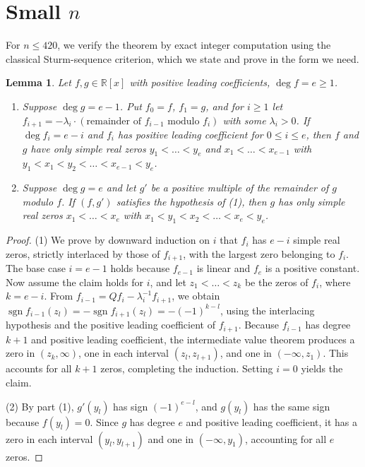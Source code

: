 \documentclass[11pt]{amsart}
\newtheorem{lemma}[theorem]{Lemma}
\theoremstyle{remark}
\newcommand{\sgn}{\operatorname{sgn}}
\begin{document}
\section{Small \texorpdfstring{$n$}{n}}\label{sec:finite}

For $n\le420$, we verify the theorem by exact integer computation using the
classical Sturm-sequence criterion, which we state and prove in the form we
need.

\begin{lemma}\label{lem:sturm}
Let $f,g\in\mathbb R[x]$ with positive leading coefficients, $\deg f=e\ge1$.
\begin{enumerate}
\item Suppose $\deg g=e-1$. Put $f_0=f$, $f_1=g$, and for $i\ge1$ let
$f_{i+1}=-\lambda_i\cdot(\text{remainder of }f_{i-1}\text{ modulo }f_i)$ with
some $\lambda_i>0$. If $\deg f_i=e-i$ and $f_i$ has positive leading
coefficient for $0\le i\le e$, then $f$ and $g$ have only simple real zeros
$y_1<\dots<y_e$ and $x_1<\dots<x_{e-1}$ with
$y_1<x_1<y_2<\dots<x_{e-1}<y_e$.
\item Suppose $\deg g=e$ and let $g'$ be a positive multiple of the remainder
of $g$ modulo $f$. If $(f,g')$ satisfies the hypothesis of (1), then $g$ has
only simple real zeros $x_1<\dots<x_e$ with $x_1<y_1<x_2<\dots<x_e<y_e$.
\end{enumerate}
\end{lemma}

\begin{proof}
(1) We prove by downward induction on $i$ that $f_i$ has $e-i$ simple real
zeros, strictly interlaced by those of $f_{i+1}$, with the largest zero
belonging to $f_i$. The base case $i=e-1$ holds because $f_{e-1}$ is linear
and $f_e$ is a positive constant. Now assume the claim holds for $i$, and
let $z_1<\dots<z_k$ be the zeros of $f_i$, where $k=e-i$. From
$f_{i-1}=Qf_i-\lambda_{i}^{-1}f_{i+1}$, we obtain
$\sgn f_{i-1}(z_l)=-\sgn f_{i+1}(z_l)=-(-1)^{k-l}$, using the interlacing
hypothesis and the positive leading coefficient of $f_{i+1}$. Because
$f_{i-1}$ has degree $k+1$ and positive leading coefficient, the
intermediate value theorem produces a zero in $(z_k,\infty)$, one in each
interval $(z_l,z_{l+1})$, and one in $(-\infty,z_1)$. This accounts for all
$k+1$ zeros, completing the induction. Setting $i=0$ yields the claim.

(2) By part (1), $g'(y_l)$ has sign $(-1)^{e-l}$, and $g(y_l)$ has the same
sign because $f(y_l)=0$. Since $g$ has degree $e$ and positive leading coefficient,
it has a zero in each interval $(y_l,y_{l+1})$ and one in $(-\infty,y_1)$,
accounting for all $e$ zeros.
\end{proof}
\end{document}
